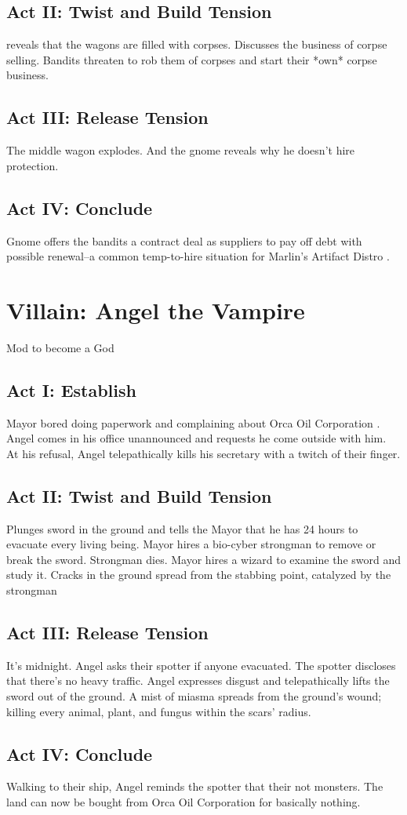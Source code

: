 \documentclass[]{article}
\newcommand{\megacorpA}{Marlin's Artifact Distro }
\newcommand{\megacorpD}{Orca Oil Corporation }
\begin{document}
\subsection*{Act II: Twist and Build Tension}
reveals that the wagons are filled with corpses. Discusses the business of corpse selling. Bandits threaten to rob them of corpses and start their *own* corpse business.
\subsection*{Act III: Release Tension}
The middle wagon explodes. And the gnome reveals why he doesn't hire protection.
\subsection*{Act IV: Conclude}
Gnome offers the bandits a contract deal as suppliers to pay off debt with possible renewal--a common temp-to-hire situation for \megacorpA. 

\section{Villain: Angel the Vampire}


Mod to become a God
\subsection*{Act I: Establish}
Mayor bored doing paperwork and complaining about \megacorpD. Angel comes in his office unannounced and requests he come outside with him. At his refusal, Angel telepathically kills his secretary with a twitch of their finger.
\subsection*{Act II: Twist and Build Tension}
Plunges sword in the ground and tells the Mayor that he has 24 hours to evacuate every living being. Mayor hires a bio-cyber strongman to remove or break the sword. Strongman dies. Mayor hires a wizard to examine the sword and study it. Cracks in the ground spread from the stabbing point, catalyzed by the strongman
\subsection*{Act III: Release Tension}
It's midnight. Angel asks their spotter if anyone evacuated. The spotter discloses that there's no heavy traffic. Angel expresses disgust and telepathically lifts the sword out of the ground. A mist of miasma spreads from the ground's wound; killing every animal, plant, and fungus within the scars' radius.
\subsection*{Act IV: Conclude}
Walking to their ship, Angel reminds the spotter that their not monsters. The land can now be bought from \megacorpD for basically nothing.
\end{document}
